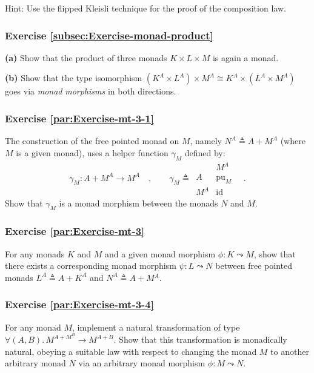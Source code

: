 Hint: Use the flipped Kleisli technique for the proof of the composition
law.

\subsubsection{Exercise \label{subsec:Exercise-monad-product}\ref{subsec:Exercise-monad-product}}

\textbf{(a)} Show that the product of three monads $K\times L\times M$
is again a monad.

\textbf{(b)} Show that the type isomorphism $(K^{A}\times L^{A})\times M^{A}\cong K^{A}\times(L^{A}\times M^{A})$
goes via \emph{monad} \emph{morphisms} in both directions.

\subsubsection{Exercise \label{par:Exercise-mt-3-1}\ref{par:Exercise-mt-3-1}}

The construction of the free pointed monad on $M$, namely $N^{A}\triangleq A+M^{A}$
(where $M$ is a given monad), uses a helper function $\gamma_{M}$
defined by:
\[
\gamma_{M}:A+M^{A}\rightarrow M^{A}\quad,\quad\quad\gamma_{M}\triangleq\,\begin{array}{|c||c|}
 & M^{A}\\
\hline A & \text{pu}_{M}\\
M^{A} & \text{id}
\end{array}\quad.
\]
Show that $\gamma_{M}$ is a monad morphism between the monads $N$
and $M$.

\subsubsection{Exercise \label{par:Exercise-mt-3}\ref{par:Exercise-mt-3}}

For any monads $K$ and $M$ and a given monad morphism $\phi:K\leadsto M$,
show that there exists a corresponding monad morphism $\psi:L\leadsto N$
between free pointed monads $L^{A}\triangleq A+K^{A}$ and $N^{A}\triangleq A+M{}^{A}$.

\subsubsection{Exercise \label{par:Exercise-mt-3-4}\ref{par:Exercise-mt-3-4}}

For any monad $M$, implement a natural transformation of type $\forall(A,B).\,M^{A+M^{B}}\rightarrow M^{A+B}$.
Show that this transformation is monadically natural, obeying a suitable
law with respect to changing the monad $M$ to another arbitrary monad
$N$ via an arbitrary monad morphism $\phi:M\leadsto N$.


